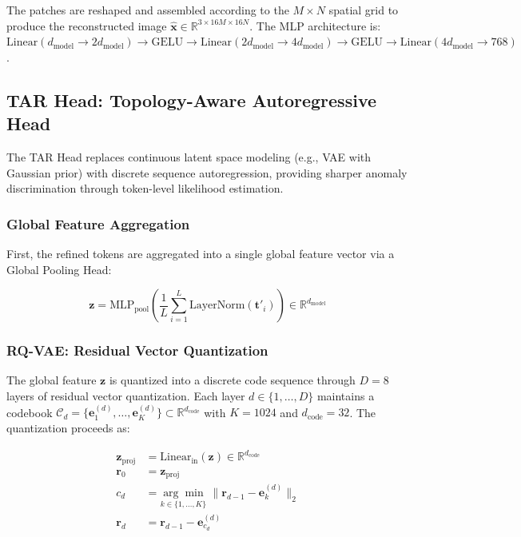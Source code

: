 \documentclass[lettersize,journal]{IEEEtran}
\begin{document}
The patches are reshaped and assembled according to the $M \times N$ spatial grid to produce the reconstructed image $\hat{\mathbf{x}} \in \mathbb{R}^{3 \times 16M \times 16N}$. The MLP architecture is: $\text{Linear}(d_{\text{model}} \to 2d_{\text{model}}) \to \text{GELU} \to \text{Linear}(2d_{\text{model}} \to 4d_{\text{model}}) \to \text{GELU} \to \text{Linear}(4d_{\text{model}} \to 768)$.

\subsection{TAR Head: Topology-Aware Autoregressive Head}
\label{sec:tar}

The TAR Head replaces continuous latent space modeling (e.g., VAE with Gaussian prior) with discrete sequence autoregression, providing sharper anomaly discrimination through token-level likelihood estimation.

\subsubsection{Global Feature Aggregation}

First, the refined tokens are aggregated into a single global feature vector via a Global Pooling Head:

\begin{equation}
\label{eq:globalpool}
\mathbf{z} = \text{MLP}_{\text{pool}}\left(\frac{1}{L} \sum_{i=1}^{L} \text{LayerNorm}(\mathbf{t}'_i)\right) \in \mathbb{R}^{d_{\text{model}}}
\end{equation}

\subsubsection{RQ-VAE: Residual Vector Quantization}

The global feature $\mathbf{z}$ is quantized into a discrete code sequence through $D = 8$ layers of residual vector quantization. Each layer $d \in \{1, \ldots, D\}$ maintains a codebook $\mathcal{C}_d = \{\mathbf{e}^{(d)}_1, \ldots, \mathbf{e}^{(d)}_K\} \subset \mathbb{R}^{d_{\text{code}}}$ with $K = 1024$ and $d_{\text{code}} = 32$. The quantization proceeds as:

\begin{equation}
\label{eq:rqvae}
\begin{aligned}
\mathbf{z}_{\text{proj}} &= \text{Linear}_{\text{in}}(\mathbf{z}) \in \mathbb{R}^{d_{\text{code}}} \\
\mathbf{r}_0 &= \mathbf{z}_{\text{proj}} \\
c_d &= \underset{k \in \{1,\ldots,K\}}{\arg\min}\; \|\mathbf{r}_{d-1} - \mathbf{e}^{(d)}_k\|_2 \\
\mathbf{r}_d &= \mathbf{r}_{d-1} - \mathbf{e}^{(d)}_{c_d}
\end{aligned}
\end{equation}
\end{document}
